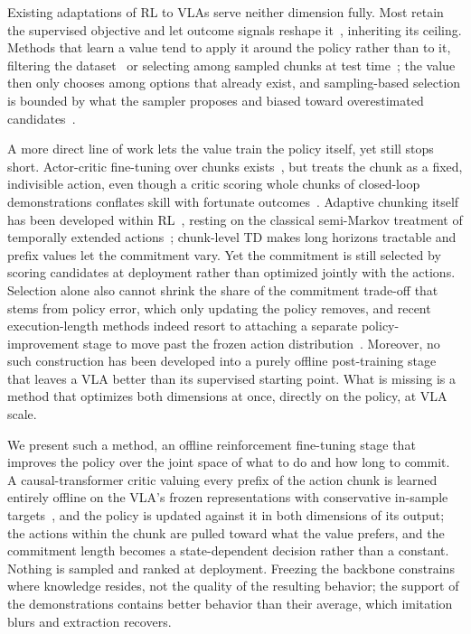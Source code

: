 Existing adaptations of RL to VLAs serve neither dimension fully. Most retain the supervised
objective and let outcome signals reshape it~\citep{pistar06, arfm, arm, reinbot, nora15}, inheriting
its ceiling. Methods that learn a value tend to apply it around the policy rather than to it,
filtering the dataset~\citep{grrl} or selecting among sampled chunks at test
time~\citep{vgps, deas}; the value then only chooses among options that already exist, and
sampling-based selection is bounded by what the sampler proposes and biased toward overestimated
candidates~\citep{emaq}.

A more direct line of work lets the value train the policy itself, yet still stops short.
Actor-critic fine-tuning over chunks exists~\citep{corft}, but treats
the chunk as a fixed, indivisible action, even though a critic scoring whole chunks of closed-loop
demonstrations conflates skill with fortunate outcomes~\citep{dqc}. Adaptive chunking itself has been
developed within RL~\citep{qc, aqc, acsac}, resting on the classical semi-Markov treatment of
temporally extended actions~\citep{sutton1999options, bradtke1994smdp}; chunk-level TD makes long
horizons tractable and prefix values let the commitment vary. Yet the commitment is still selected
by scoring candidates at deployment rather than optimized jointly with the actions. Selection alone
also cannot shrink the share of the commitment trade-off that stems from policy error, which only
updating the policy removes, and recent execution-length methods indeed resort to attaching a
separate policy-improvement stage to move past the frozen action distribution~\citep{exrl}.
Moreover, no such construction has been developed into a purely offline post-training stage that
leaves a VLA better than its supervised starting point. What is missing is a method that
optimizes both dimensions at once, directly on the policy, at VLA scale.

We present such a method, an offline reinforcement fine-tuning stage that improves the policy over
the joint space of what to do and how long to commit. A causal-transformer critic valuing every
prefix of the action chunk is learned entirely offline on the VLA's frozen representations with
conservative in-sample targets~\citep{iql, deas}, and the policy is updated against it in both
dimensions of its output; the actions within the chunk are pulled toward what the value prefers, and
the commitment length becomes a state-dependent decision rather than a constant. Nothing is sampled
and ranked at deployment. Freezing the backbone constrains where knowledge resides, not the quality
of the resulting behavior; the support of the demonstrations contains better behavior than their
average, which imitation blurs and extraction recovers.


